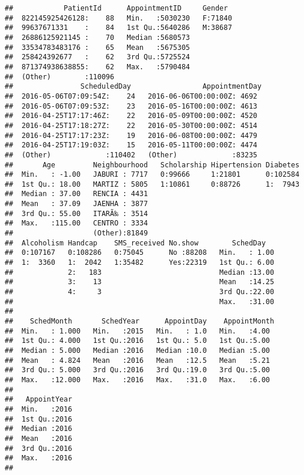 \documentclass[]{article}
\begin{document}
\begin{verbatim}
##            PatientId      AppointmentID     Gender   
##  822145925426128:    88   Min.   :5030230   F:71840  
##  99637671331    :    84   1st Qu.:5640286   M:38687  
##  26886125921145 :    70   Median :5680573            
##  33534783483176 :    65   Mean   :5675305            
##  258424392677   :    62   3rd Qu.:5725524            
##  871374938638855:    62   Max.   :5790484            
##  (Other)        :110096                              
##                ScheduledDay                 AppointmentDay 
##  2016-05-06T07:09:54Z:    24   2016-06-06T00:00:00Z: 4692  
##  2016-05-06T07:09:53Z:    23   2016-05-16T00:00:00Z: 4613  
##  2016-04-25T17:17:46Z:    22   2016-05-09T00:00:00Z: 4520  
##  2016-04-25T17:18:27Z:    22   2016-05-30T00:00:00Z: 4514  
##  2016-04-25T17:17:23Z:    19   2016-06-08T00:00:00Z: 4479  
##  2016-04-25T17:19:03Z:    15   2016-05-11T00:00:00Z: 4474  
##  (Other)             :110402   (Other)             :83235  
##       Age         Neighbourhood   Scholarship Hipertension Diabetes  
##  Min.   : -1.00   JABURI : 7717   0:99666     1:21801      0:102584  
##  1st Qu.: 18.00   MARTIZ : 5805   1:10861     0:88726      1:  7943  
##  Median : 37.00   RENCIA : 4431                                      
##  Mean   : 37.09   JAENHA : 3877                                      
##  3rd Qu.: 55.00   ITARÃ‰ : 3514                                      
##  Max.   :115.00   CENTRO : 3334                                      
##                   (Other):81849                                      
##  Alcoholism Handcap    SMS_received No.show        SchedDay    
##  0:107167   0:108286   0:75045      No :88208   Min.   : 1.00  
##  1:  3360   1:  2042   1:35482      Yes:22319   1st Qu.: 6.00  
##             2:   183                            Median :13.00  
##             3:    13                            Mean   :14.25  
##             4:     3                            3rd Qu.:22.00  
##                                                 Max.   :31.00  
##                                                                
##    SchedMonth       SchedYear      AppointDay    AppointMonth 
##  Min.   : 1.000   Min.   :2015   Min.   : 1.0   Min.   :4.00  
##  1st Qu.: 4.000   1st Qu.:2016   1st Qu.: 5.0   1st Qu.:5.00  
##  Median : 5.000   Median :2016   Median :10.0   Median :5.00  
##  Mean   : 4.824   Mean   :2016   Mean   :12.5   Mean   :5.21  
##  3rd Qu.: 5.000   3rd Qu.:2016   3rd Qu.:19.0   3rd Qu.:5.00  
##  Max.   :12.000   Max.   :2016   Max.   :31.0   Max.   :6.00  
##                                                               
##   AppointYear  
##  Min.   :2016  
##  1st Qu.:2016  
##  Median :2016  
##  Mean   :2016  
##  3rd Qu.:2016  
##  Max.   :2016  
## 
\end{verbatim}
\end{document}

